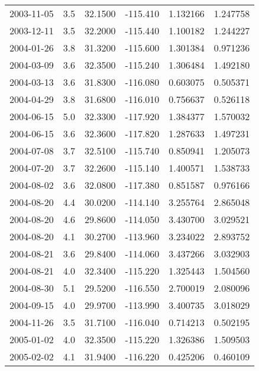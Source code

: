 \begin{tabular}{lrrrrr}
2003-11-05 &       3.5 &  32.1500 &  -115.410 &         1.132166 &         1.247758 \\
2003-12-11 &       3.5 &  32.2000 &  -115.440 &         1.100182 &         1.244227 \\
2004-01-26 &       3.8 &  31.3200 &  -115.600 &         1.301384 &         0.971236 \\
2004-03-09 &       3.6 &  32.3500 &  -115.240 &         1.306484 &         1.492180 \\
2004-03-13 &       3.6 &  31.8300 &  -116.080 &         0.603075 &         0.505371 \\
2004-04-29 &       3.8 &  31.6800 &  -116.010 &         0.756637 &         0.526118 \\
2004-06-15 &       5.0 &  32.3300 &  -117.920 &         1.384377 &         1.570032 \\
2004-06-15 &       3.6 &  32.3600 &  -117.820 &         1.287633 &         1.497231 \\
2004-07-08 &       3.7 &  32.5100 &  -115.740 &         0.850941 &         1.205073 \\
2004-07-20 &       3.7 &  32.2600 &  -115.140 &         1.400571 &         1.538733 \\
2004-08-02 &       3.6 &  32.0800 &  -117.380 &         0.851587 &         0.976166 \\
2004-08-20 &       4.4 &  30.0200 &  -114.140 &         3.255764 &         2.865048 \\
2004-08-20 &       4.6 &  29.8600 &  -114.050 &         3.430700 &         3.029521 \\
2004-08-20 &       4.1 &  30.2700 &  -113.960 &         3.234022 &         2.893752 \\
2004-08-21 &       3.6 &  29.8400 &  -114.060 &         3.437266 &         3.032903 \\
2004-08-21 &       4.0 &  32.3400 &  -115.220 &         1.325443 &         1.504560 \\
2004-08-30 &       5.1 &  29.5200 &  -116.550 &         2.700019 &         2.080096 \\
2004-09-15 &       4.0 &  29.9700 &  -113.990 &         3.400735 &         3.018029 \\
2004-11-26 &       3.5 &  31.7100 &  -116.040 &         0.714213 &         0.502195 \\
2005-01-02 &       4.0 &  32.3500 &  -115.220 &         1.326386 &         1.509503 \\
2005-02-02 &       4.1 &  31.9400 &  -116.220 &         0.425206 &         0.460109 \\

\end{tabular}
